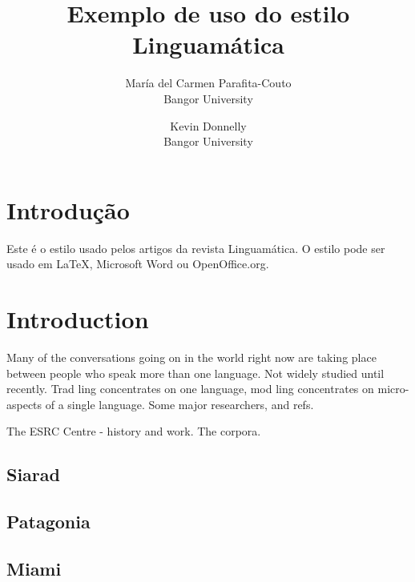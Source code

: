 \documentclass[a4paper, twocolumn, 11pt, twoside]{article}
\title{Exemplo de uso do estilo Linguamática}
\author{
  María del Carmen Parafita-Couto\\
  Bangor University\\
  \email{maricarme@gmail.com} 
  \and 
  Kevin Donnelly\\
  Bangor University\\
  \email{kevin@dotmon.com}
}
\date{}
\begin{document}
\thispagestyle{empty}


\section{Introdução}

Este é o estilo usado pelos artigos da revista Linguamática. O estilo pode ser usado em \LaTeX \cite{latexcompanion}, Microsoft Word ou OpenOffice.org.


\section{Introduction}

Many of the conversations going on in the world right now are taking place between people who speak more than one language.  Not widely studied until recently.  Trad ling concentrates on one language, mod ling concentrates on micro-aspects of a single language.  Some major researchers, and refs.

The ESRC Centre - history and work.  The corpora.

\subsection{Siarad}

\subsection{Patagonia}

\subsection{Miami}
\end{document}
